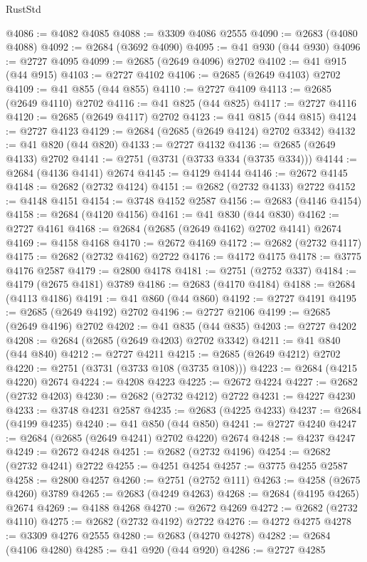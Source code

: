 \begin{lexlean}{RustStd}
\begin{coremodule}
{\begin{coremodule}
{{{{{{{{{{{{{{{{{{{{{{{{{{@4086 := @4082 @4085
@4088 := @3309 @4086 @2555
@4090 := @2683 (@4080 @4088)
@4092 := @2684 (@3692 @4090)
@4095 := @41 @930 (@44 @930)
@4096 := @2727 @4095
@4099 := @2685 (@2649 @4096) @2702
@4102 := @41 @915 (@44 @915)
@4103 := @2727 @4102
@4106 := @2685 (@2649 @4103) @2702
@4109 := @41 @855 (@44 @855)
@4110 := @2727 @4109
@4113 := @2685 (@2649 @4110) @2702
@4116 := @41 @825 (@44 @825)
@4117 := @2727 @4116
@4120 := @2685 (@2649 @4117) @2702
@4123 := @41 @815 (@44 @815)
@4124 := @2727 @4123
@4129 := @2684 (@2685 (@2649 @4124) @2702 @3342)
@4132 := @41 @820 (@44 @820)
@4133 := @2727 @4132
@4136 := @2685 (@2649 @4133) @2702
@4141 := @2751 (@3731 (@3733 @334 (@3735 @334)))
@4144 := @2684 (@4136 @4141) @2674
@4145 := @4129 @4144
@4146 := @2672 @4145
@4148 := @2682 (@2732 @4124)
@4151 := @2682 (@2732 @4133) @2722
@4152 := @4148 @4151
@4154 := @3748 @4152 @2587
@4156 := @2683 (@4146 @4154)
@4158 := @2684 (@4120 @4156)
@4161 := @41 @830 (@44 @830)
@4162 := @2727 @4161
@4168 := @2684 (@2685 (@2649 @4162) @2702 @4141) @2674
@4169 := @4158 @4168
@4170 := @2672 @4169
@4172 := @2682 (@2732 @4117)
@4175 := @2682 (@2732 @4162) @2722
@4176 := @4172 @4175
@4178 := @3775 @4176 @2587
@4179 := @2800 @4178
@4181 := @2751 (@2752 @337)
@4184 := @4179 (@2675 @4181) @3789
@4186 := @2683 (@4170 @4184)
@4188 := @2684 (@4113 @4186)
@4191 := @41 @860 (@44 @860)
@4192 := @2727 @4191
@4195 := @2685 (@2649 @4192) @2702
@4196 := @2727 @2106
@4199 := @2685 (@2649 @4196) @2702
@4202 := @41 @835 (@44 @835)
@4203 := @2727 @4202
@4208 := @2684 (@2685 (@2649 @4203) @2702 @3342)
@4211 := @41 @840 (@44 @840)
@4212 := @2727 @4211
@4215 := @2685 (@2649 @4212) @2702
@4220 := @2751 (@3731 (@3733 @108 (@3735 @108)))
@4223 := @2684 (@4215 @4220) @2674
@4224 := @4208 @4223
@4225 := @2672 @4224
@4227 := @2682 (@2732 @4203)
@4230 := @2682 (@2732 @4212) @2722
@4231 := @4227 @4230
@4233 := @3748 @4231 @2587
@4235 := @2683 (@4225 @4233)
@4237 := @2684 (@4199 @4235)
@4240 := @41 @850 (@44 @850)
@4241 := @2727 @4240
@4247 := @2684 (@2685 (@2649 @4241) @2702 @4220) @2674
@4248 := @4237 @4247
@4249 := @2672 @4248
@4251 := @2682 (@2732 @4196)
@4254 := @2682 (@2732 @4241) @2722
@4255 := @4251 @4254
@4257 := @3775 @4255 @2587
@4258 := @2800 @4257
@4260 := @2751 (@2752 @111)
@4263 := @4258 (@2675 @4260) @3789
@4265 := @2683 (@4249 @4263)
@4268 := @2684 (@4195 @4265) @2674
@4269 := @4188 @4268
@4270 := @2672 @4269
@4272 := @2682 (@2732 @4110)
@4275 := @2682 (@2732 @4192) @2722
@4276 := @4272 @4275
@4278 := @3309 @4276 @2555
@4280 := @2683 (@4270 @4278)
@4282 := @2684 (@4106 @4280)
@4285 := @41 @920 (@44 @920)
@4286 := @2727 @4285
}}}}}}}}}}}}}}}}}}}}}}}}}}
\end{coremodule}}
\end{coremodule}
\end{lexlean}
